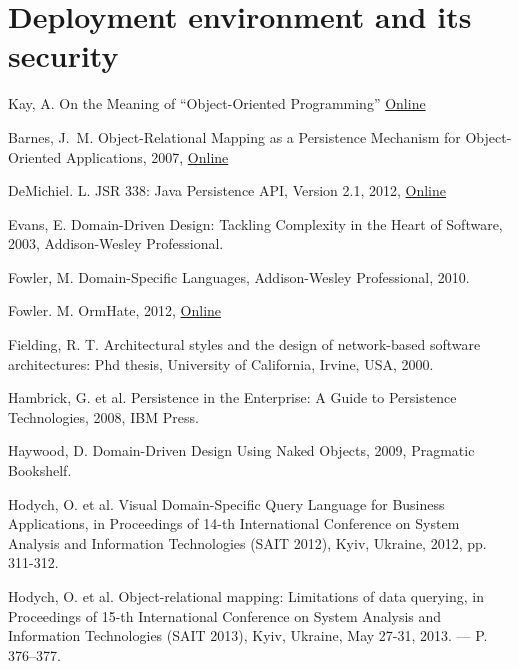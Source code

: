 \documentclass[a4paper,12pt,oneside,openright]{memoir}
\begin{document}
\section*{Deployment environment and its security}

%
%
\begin{thebibliography}{5}

Kay, A. On the Meaning of ``Object-Oriented Programming''
\href{http://www.purl.org/stefan_ram/pub/doc_kay_oop_en}{Online}

Bar\-nes, J.~M. Object-Relational Mapping as a Persistence Mechanism for Object-Oriented Applications, 2007,
\href{http://digitalcommons.macalester.edu/mathcs_honors/6/}{Online}

De\-Mi\-chiel. L. JSR 338: Java Persistence API, Version 2.1, 2012,
\href{http://jcp.org/aboutJava/communityprocess/pr/jsr338/index.html}{Online}

Evans, E. Domain-Driven Design: Tackling Complexity in the Heart of Software, 2003, Addison-Wesley Professional.

Fow\-ler, M. Domain-Specific Languages, Addison-Wesley Professional, 2010.

Fow\-ler. M. OrmHate, 2012,
\href{http://martinfowler.com/bliki/OrmHate.html}{Online}

Fielding, R. T. Architectural styles and the design of network-based software architectures: Phd thesis, University of California, Irvine, USA, 2000.

Hambrick, G. et al. Persistence in the Enterprise: A Guide to Persistence Technologies, 2008, IBM Press.

Haywood, D. Domain-Driven Design Using Naked Objects, 2009, Pragmatic Bookshelf.

Hodych, O. et al. Visual Domain-Specific Query Language for Business Applications, in Proceedings of 14-th International Conference on System Analysis and Information Technologies (SAIT 2012), Kyiv, Ukraine, 2012, pp. 311-312.

Hodych, O. et al. Object-relational mapping: Limitations of data querying, in Proceedings of 15-th International Conference on System Analysis and Information Technologies (SAIT 2013), Kyiv, Ukraine, May 27-31, 2013. — P. 376–377.


\end{thebibliography}
\end{document}
